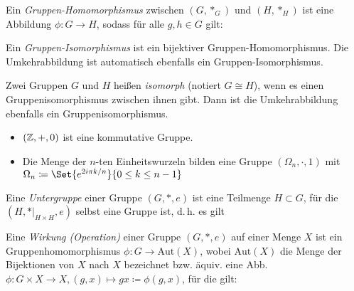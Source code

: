 \documentclass{cheat-sheet}
\begin{document}

\begin{defn}
  Ein \emph{Gruppen-Homomorphismus} zwischen $(G, *_G)$ und $(H, *_H)$ ist eine Abbildung $\phi : G \to H$, sodass für alle $g, h \in G$ gilt:
  \begin{itemize}
  \end{itemize}
\end{defn}

\begin{defn}
  Ein \emph{Gruppen-Isomorphismus} ist ein bijektiver Gruppen-Homomorphismus. Die Umkehrabbildung ist automatisch ebenfalls ein Gruppen-Isomorphismus.
\end{defn}

\begin{defn}
  Zwei Gruppen $G$ und $H$ heißen \emph{isomorph} (notiert $G \cong H$), wenn es einen Gruppenisomorphismus zwischen ihnen gibt. Dann ist die Umkehrabbildung ebenfalls ein Gruppenisomorphismus.
\end{defn}

\begin{bspe}
  \begin{itemize}
    \item $(\mathbb{Z}, +, 0)$ ist eine kommutative Gruppe.
    \item Die Menge der $n$-ten Einheitswurzeln bilden eine Gruppe $(\Omega_n, \cdot, 1)$ mit $\Omega_n \coloneqq \Set{ e^{2i \pi k/n} }{ 0 \leq k \leq n - 1 }$
  \end{itemize}
\end{bspe}

\begin{defn}
  Eine \emph{Untergruppe} einer Gruppe $(G, *, e)$ ist eine Teilmenge $H \subset G$, für die $(H, *|_{H \times H}, e)$ selbst eine Gruppe ist, d.\,h. es gilt
  \begin{itemize}
  \end{itemize}
\end{defn}



\begin{defn}
  Eine \emph{Wirkung (Operation)} einer Gruppe $(G, *, e)$ auf einer Menge $X$ ist ein Gruppenhomomorphismus $\phi : G \to \mathrm{Aut}(X)$, wobei $\mathrm{Aut}(X)$ die Menge der Bijektionen von $X$ nach $X$ bezeichnet bzw. äquiv. eine Abb. $\phi : G \times X \to X, (g, x) \mapsto gx \coloneqq \phi(g, x)$, für die gilt:
  \begin{itemize}
  \end{itemize}
\end{defn}
\end{document}

